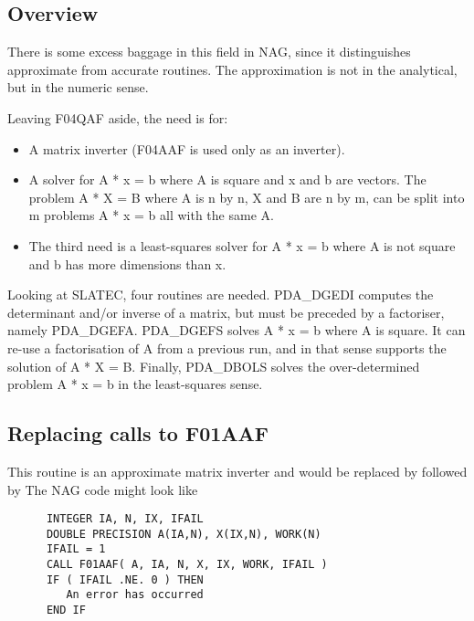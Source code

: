 
\subsection{Overview}

   There is some excess baggage in this field in NAG, since it
   distinguishes approximate from accurate routines. The approximation
   is not in the analytical, but in the numeric sense.

   Leaving F04QAF aside, the need is for:

\begin{itemize}
\item A matrix inverter (F04AAF is used only as an inverter).
\item A solver for A * x = b where A is square and x and b are vectors.
   The problem A * X = B where A is n by n, X and B are n by m, can be
   split into m problems A * x = b all with the same A.
\item The third need is a least-squares solver for A * x = b where A is
   not square and b has more dimensions than x.
\end{itemize}

   Looking at SLATEC, four routines are needed. PDA\_DGEDI computes the
   determinant and/or inverse of a matrix, but must be preceded by a
   factoriser, namely PDA\_DGEFA. PDA\_DGEFS solves A * x = b where A is square.
   It can re-use a factorisation of A from a previous run, and in that
   sense supports the solution of A * X = B. Finally, PDA\_DBOLS solves the
   over-determined problem A * x = b in the least-squares sense. 


\subsection{Replacing calls to F01AAF}

   This routine is an approximate matrix inverter and would be replaced
   by
   followed by
   The NAG code might look like

\begin{verbatim}
      INTEGER IA, N, IX, IFAIL
      DOUBLE PRECISION A(IA,N), X(IX,N), WORK(N)
      IFAIL = 1
      CALL F01AAF( A, IA, N, X, IX, WORK, IFAIL )
      IF ( IFAIL .NE. 0 ) THEN
         An error has occurred
      END IF
\end{verbatim}

